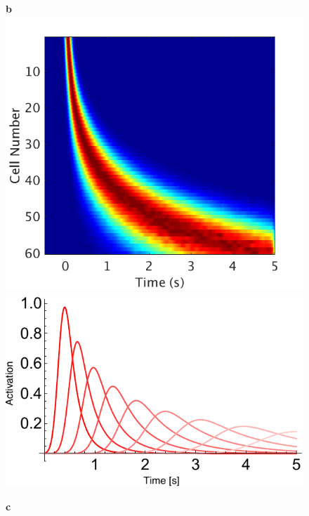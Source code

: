 \documentclass{apa}
\begin{document}
\begin{figure}
	\begin{minipage}{.25\linewidth}
		\textbf{b}
		\includegraphics[width=.99\linewidth]{figs/HeatmapTimeCellsV2.png}
		\includegraphics[width=.99\linewidth]{figs/TimeCellParams.pdf}
	\end{minipage}
	\begin{minipage}{0.5\linewidth}
		\textbf{c}
		\begin{center}

\end{center}
\end{minipage}
\end{figure}
\end{document}
